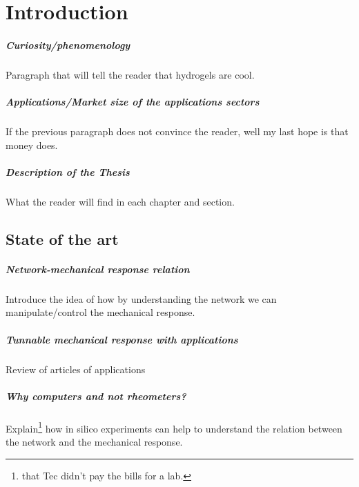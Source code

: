 \chapter{Introduction}\label{ch1:Intro}


\paragraph{Curiosity/phenomenology} Paragraph that will tell the reader that hydrogels are cool.

\paragraph{Applications/Market size of the applications sectors} If the previous paragraph does not convince the reader, well my last hope is that money does.

\paragraph{Description of the Thesis} What the reader will find in each chapter and section.

\section{State of the art}\label{ch1:StateArt}

\paragraph{Network-mechanical response relation} Introduce the idea of how by understanding the network we can manipulate/control the mechanical response.

\paragraph{Tunnable mechanical response with applications} Review of articles of applications 

\paragraph{Why computers and not rheometers?} Explain\footnote{that Tec didn't pay the bills for a lab.} how in silico experiments can help to understand the relation between the network and the mechanical response.



